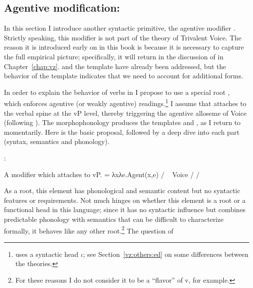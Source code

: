 \begin{exe}
\begin{xlist}
\begin{exe}
\begin{xlist}
\begin{exe}
\begin{xlist}
\begin{exe}
\begin{exe}
\begin{xlist}
\begin{exe}
\begin{xlist}
\begin{exe}
\begin{xlist}
\begin{exe}
\begin{xlist}
\begin{exe}
\begin{xlist}
\begin{exe}
\begin{xlist}
\begin{exe}
\begin{xlist}
\begin{exe}
\begin{xlist}
\begin{exe}
\begin{xlist}
\begin{exe}
\begin{xlist}
\begin{exe}
\begin{xlist}
\begin{exe}
\begin{xlist}
\begin{exe}
\begin{xlist}
\begin{exe}
\begin{exe}
\begin{xlist}
\begin{exe}
\begin{xlist}
\begin{exe}
\begin{xlist}
\begin{exe}
\begin{xlist}
{\begin{exe}
\begin{xlist}
\begin{exe}
\begin{xlist}
\begin{exe}
\begin{xlist}
\begin{exe}
\begin{xlist}
\begin{xlist}
\begin{xlist}
\begin{exe}
\begin{xlist}
\begin{xlist}
\begin{xlist}
\begin{exe}
\begin{exe}
\begin{xlist}
\begin{exe}
\begin{xlist}
\begin{exe}
\begin{xlist}
\begin{exe}
\begin{xlist}
\begin{exe}
\begin{xlist}
\begin{exe}
\begin{xlist}
\begin{exe}
\begin{xlist}
\begin{exe}
\begin{exe}
\begin{xlist}
\begin{xlist}
\begin{exe}
\begin{xlist}
\begin{exe}
\begin{xlist}
\begin{exe}
\begin{xlist}
\begin{exe}
\begin{xlist}
\section{Agentive modification: \va} \label{voice:va}
In this section I introduce another syntactic primitive, the agentive modifier {\va}. Strictly speaking, this modifier is not part of the theory of Trivalent Voice. The reason it is introduced early on in this book is because it is necessary to capture the full empirical picture; specifically, it will return in the discussion of {\vz} in Chapter~\ref{chap:vz}.  and the template {\tkal} have already been addressed, but the behavior of the template {\tpie} indicates that we need to account for additional forms.

In order to explain the behavior of verbs in {\tpie} I propose to use a special root {\va}, which enforces agentive (or weakly agentive) readings.\footnote{\cite{doron03} uses a syntactic head $\iota$; see Section~\ref{vz:others:ed} on some differences between the theories.} I assume that {\va} attaches to the verbal spine at the vP level, thereby triggering the agentive alloseme of Voice (following \citealt{doron03,doron14adj}). The morphophonology produces the templates {\tpie} and {\thit}, as I return to momentarily. Here is the basic proposal, followed by a deep dive into each part (syntax, semantics and phonology).
 \begin{exe}
 \ex  {\va}: 
 \begin{xlist} 
 	\ex   A modifier which attaches to vP. 
 	\ex   {} = λxλe.Agent(x,e) / \trace~\va 
 	\ex   Voice {\lra} {\tpie} / {\trace} {\va} 
 	\ex   {\vz} {\lra} {\thit} / {\trace} {\va} 
 \z
\z 

As a root, this element has phonological and semantic content but no syntactic features or requirements. Not much hinges on whether this element is a root or a functional head in this language; since it has no syntactic influence but combines predictable phonology with semantics that can be difficult to characterize formally, it behaves like any other root.\footnote{For these reasons I do not consider it to be a ``flavor'' of v, for example.} The question of 
\end{xlist}
\end{exe}
\end{xlist}
\end{exe}
\end{xlist}
\end{exe}
\end{xlist}
\end{exe}
\end{xlist}
\end{exe}
\end{xlist}
\end{xlist}
\end{exe}
\end{exe}
\end{xlist}
\end{exe}
\end{xlist}
\end{exe}
\end{xlist}
\end{exe}
\end{xlist}
\end{exe}
\end{xlist}
\end{exe}
\end{xlist}
\end{exe}
\end{xlist}
\end{exe}
\end{exe}
\end{xlist}
\end{xlist}
\end{xlist}
\end{exe}
\end{xlist}
\end{xlist}
\end{xlist}
\end{exe}
\end{xlist}
\end{exe}
\end{xlist}
\end{exe}
\end{xlist}
\end{exe}}
\end{xlist}
\end{exe}
\end{xlist}
\end{exe}
\end{xlist}
\end{exe}
\end{xlist}
\end{exe}
\end{exe}
\end{xlist}
\end{exe}
\end{xlist}
\end{exe}
\end{xlist}
\end{exe}
\end{xlist}
\end{exe}
\end{xlist}
\end{exe}
\end{xlist}
\end{exe}
\end{xlist}
\end{exe}
\end{xlist}
\end{exe}
\end{xlist}
\end{exe}
\end{xlist}
\end{exe}
\end{xlist}
\end{exe}
\end{xlist}
\end{exe}
\end{xlist}
\end{exe}
\end{exe}
\end{xlist}
\end{exe}
\end{xlist}
\end{exe}
\end{xlist}
\end{exe}
